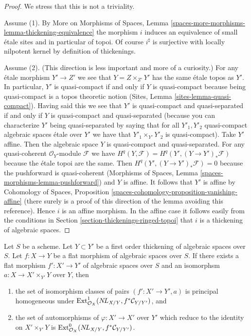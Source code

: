 \begin{proof}
We stress that this is not a triviality.

\medskip\noindent
Assume (1). By More on Morphisms of Spaces, Lemma
\ref{spaces-more-morphisms-lemma-thickening-equivalence}
the morphism $i$ induces an equivalence of small \'etale
sites and in particular of topoi. Of course $i^\sharp$
is surjective with locally nilpotent kernel by definition
of thickenings.

\medskip\noindent
Assume (2). (This direction is less important and more of
a curiosity.) For any \'etale morphism $Y' \to Z'$ we see
that $Y = Z \times_{Z'} Y'$ has the same \'etale topos
as $Y'$. In particular, $Y'$ is quasi-compact if and only if
$Y$ is quasi-compact because being quasi-compact
is a topos theoretic notion (Sites, Lemma \ref{sites-lemma-quasi-compact}).
Having said this we see that $Y'$ is quasi-compact and quasi-separated
if and only if $Y$ is quasi-compact and quasi-separated
(because you can characterize $Y'$ being quasi-separated by saying
that for all $Y'_1, Y'_2$ quasi-compact algebraic spaces \'etale over $Y'$
we have that $Y'_1 \times_{Y'} Y'_2$ is quasi-compact).
Take $Y'$ affine. Then the algebraic space $Y$ is
quasi-compact and quasi-separated. For any
quasi-coherent $\mathcal{O}_Y$-module $\mathcal{F}$ we have
$H^q(Y, \mathcal{F}) = H^q(Y', (Y \to Y')_*\mathcal{F})$
because the \'etale topoi are the same.
Then $H^q(Y', (Y \to Y')_*\mathcal{F}) = 0$
because the pushforward is quasi-coherent
(Morphisms of Spaces, Lemma \ref{spaces-morphisms-lemma-pushforward})
and $Y$ is affine. It follows that $Y'$ is affine by
Cohomology of Spaces, Proposition
\ref{spaces-cohomology-proposition-vanishing-affine}
(there surely is a proof of this direction of the lemma
avoiding this reference).
Hence $i$ is an affine morphism. In the affine case it
follows easily from the conditions in
Section \ref{section-thickenings-ringed-topoi}
that $i$ is a thickening of algebraic spaces.
\end{proof}

\begin{lemma}
\label{lemma-deform-spaces}
Let $S$ be a scheme.
Let $Y \subset Y'$ be a first order thickening of algebraic spaces
over $S$.
Let $f : X \to Y$ be a flat morphism of algebraic spaces over $S$.
If there exists a flat morphism $f' : X' \to Y'$ of algebraic spaces over $S$
and an isomorphsm $a : X \to X' \times_{Y'} Y$ over $Y$, then
\begin{enumerate}
\item the set of isomorphism classes of pairs $(f' : X' \to Y', a)$ is
principal homogeneous under
$\mathop{\mathrm{Ext}}\nolimits^1_{\mathcal{O}_X}(\mathop{N\!L}\nolimits_{X/Y}, f^*\mathcal{C}_{Y/Y'})$, and
\item the set of automorphisms of $\varphi : X' \to X'$
over $Y'$ which reduce to the identity on $X' \times_{Y'} Y$
is $\mathop{\mathrm{Ext}}\nolimits^0_{\mathcal{O}_X}(\mathop{N\!L}\nolimits_{X/Y}, f^*\mathcal{C}_{Y/Y'})$.
\end{enumerate}
\end{lemma}

